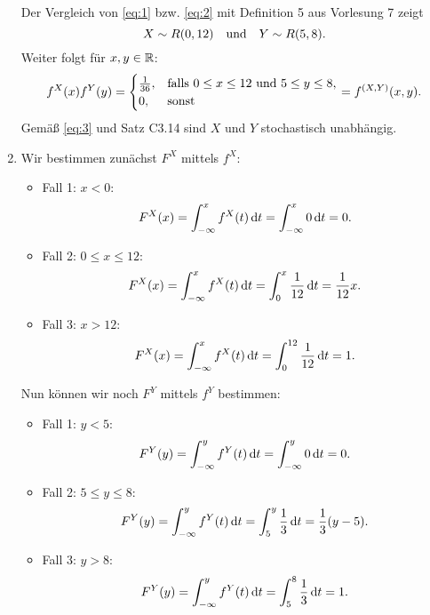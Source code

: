 \documentclass{exercise}
\begin{document}
\begin{enumerate}
        Der Vergleich von \eqref{eq:1} bzw. \eqref{eq:2} mit Definition 5 aus Vorlesung 7 zeigt
        \[
            X \sim R\parentheses*{0, 12} \quad \text{und} \quad Y \sim R\parentheses*{5, 8}.
        \]
        Weiter folgt für \(x, y \in \mathbb{R}\):
        \begin{equation}\label{eq:3}
            f^X\parentheses*{x}f^Y\parentheses*{y} = \begin{cases}
                \frac{1}{36}, & \text{falls }0 \le x \le 12\text{ und }5 \le y \le 8,\\
                0, & \text{sonst}
            \end{cases} = f^{\parentheses*{X, Y}}\parentheses*{x, y}.
        \end{equation}
        Gemäß \eqref{eq:3} und Satz C3.14 sind \(X\) und \(Y\) stochastisch unabhängig.
        \item Wir bestimmen zunächst \(F^X\) mittels \(f^X\):
        \begin{itemize}
            \item Fall 1: \(x < 0\):
            \[
                F^X\parentheses*{x} = \int_{-\infty}^x f^X\parentheses*{t}\d t = \int_{-\infty}^x 0\d t = 0.
            \]
            \item Fall 2: \(0 \le x \le 12\):
            \[
                F^X\parentheses*{x} = \int_{-\infty}^x f^X\parentheses*{t}\d t = \int_0^x \frac{1}{12}\d t = \frac{1}{12}x.
            \]
            \item Fall 3: \(x > 12\):
            \[
                F^X\parentheses*{x} = \int_{-\infty}^x f^X\parentheses*{t}\d t = \int_0^{12}\frac{1}{12}\d t = 1.
            \]
        \end{itemize}
        Nun können wir noch \(F^Y\) mittels \(f^Y\) bestimmen:
        \begin{itemize}
            \item Fall 1: \(y < 5\):
            \[
                F^Y\parentheses*{y} = \int_{-\infty}^y f^Y\parentheses*{t}\d t = \int_{-\infty}^y 0\d t = 0.
            \]
            \item Fall 2: \(5 \le y \le 8\):
            \[
                F^Y\parentheses*{y} = \int_{-\infty}^y f^Y\parentheses*{t}\d t = \int_5^y \frac{1}{3}\d t = \frac{1}{3}\parentheses*{y - 5}.
            \]
            \item Fall 3: \(y > 8\):
            \[
                F^Y\parentheses*{y} = \int_{-\infty}^y f^Y\parentheses*{t}\d t = \int_5^8 \frac{1}{3}\d t = 1.
            \]
        \end{itemize}

\end{enumerate}
\end{document}

